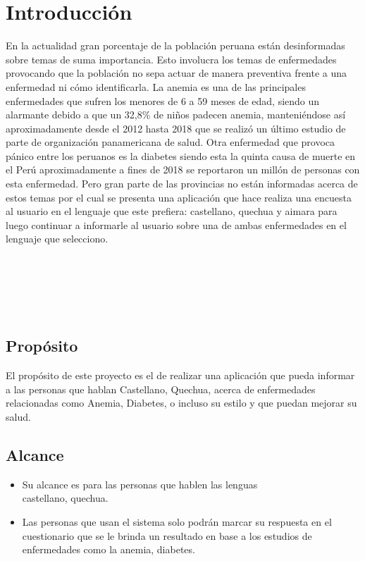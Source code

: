 \chapter{Introducción}
En la actualidad gran porcentaje de la población peruana están desinformadas sobre temas de suma importancia. Esto involucra los temas de enfermedades provocando que la población no sepa actuar de manera preventiva frente a una enfermedad ni cómo identificarla. La anemia es una de las principales enfermedades que sufren los menores de 6 a 59 meses de edad, siendo un alarmante debido a que un 32,8\% de niños padecen anemia, manteniéndose así aproximadamente desde el 2012 hasta 2018 que se realizó un último estudio de parte de organización panamericana de salud. Otra enfermedad que provoca pánico entre los peruanos es la diabetes siendo esta la quinta causa de muerte en el Perú aproximadamente a fines de 2018 se reportaron un millón de personas con esta enfermedad. Pero gran parte de las provincias no están informadas acerca de estos temas por el cual se presenta una aplicación que hace realiza una encuesta al usuario en el lenguaje que este prefiera: castellano, quechua y aimara para luego continuar a informarle al usuario sobre una de ambas enfermedades en el lenguaje que selecciono. 
\\
\\
\\
\\
\\
\\
\section{Propósito}
El propósito de este proyecto es el de realizar una aplicación que pueda informar a las personas que hablan Castellano, Quechua, acerca de enfermedades relacionadas como Anemia, Diabetes, o incluso su estilo y que puedan mejorar su salud.  
\section{Alcance}
\begin{itemize}
\item Su alcance es para las personas que hablen las lenguas \\castellano, quechua.
\item Las personas que usan el sistema solo podrán marcar su respuesta en el cuestionario que se le brinda un resultado en base a los estudios de enfermedades como la anemia, diabetes.
\end{itemize}

